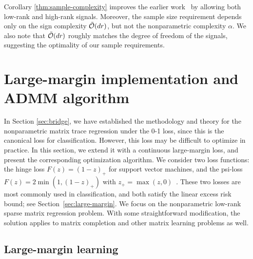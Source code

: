 \documentclass[11pt]{article}
\theoremstyle{plain}
\theoremstyle{definition}
\begin{document}
\noindent
Corollary \ref{thm:sample-complexity} improves the earlier work~\citep{yuan2016tensor, pmlr-v119-lee20i} by allowing both low-rank and high-rank signals. Moreover, the sample size requirement depends only on the sign complexity $\tilde {\mathcal{O}}(dr)$, but not the nonparametric complexity $\alpha$. We also note that $\tilde {\mathcal{O}}(dr)$ roughly matches the degree of freedom of the signals, suggesting the optimality of our sample requirements.





\section{Large-margin implementation and ADMM algorithm}
\label{sec:estimation}

In Section \ref{sec:bridge}, we have established the methodology and theory for the nonparametric matrix trace regression under the 0-1 loss, since this is the canonical loss for classification. However, this loss may be difficult to optimize in practice. In this section, we extend it with a continuous large-margin loss, and present the corresponding optimization algorithm. We consider two loss functions: the hinge loss $F(z) = (1-z)_+$ for support vector machines, and the psi-loss $F(z)=2\min(1,(1-z)_+)$ with $z_{+}=\max(z,0)$~\citep{shen2003psi}. These two losses are most commonly used in classification, and both satisfy the linear excess risk bound; see Section~\ref{sec:large-margin}. We focus on the nonparametric low-rank sparse matrix regression problem. With some straightforward modification, the solution applies to matrix completion and other matrix learning problems as well. 



\subsection{Large-margin learning} 
\end{document}
